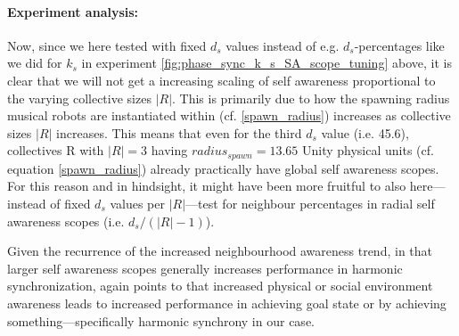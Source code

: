 				\paragraph{Experiment analysis:\nl}
				
				Now, since we here tested with fixed $d_s$ values instead of e.g. $d_s$-percentages like we did for $k_s$ in experiment \ref{fig:phase_sync_k_s_SA_scope_tuning} above, it is clear that we will not get a increasing scaling of self awareness proportional to the varying collective sizes $|R|$. This is primarily due to how the spawning radius musical robots are instantiated within (cf. \eqref{spawn_radius}) increases as collective sizes $|R|$ increases. This means that even for the third $d_s$ value (i.e. 45.6), collectives R with $|R|=3$ having $radius_{spawn}=13.65$ Unity physical units (cf. equation \eqref{spawn_radius}) already practically have global self awareness scopes. For this reason and in hindsight, it might have been more fruitful to also here—instead of fixed $d_s$ values per $|R|$—test for neighbour percentages in radial self awareness scopes (i.e. $d_s/(|R|-1)$).
				
				Given the recurrence of the increased neighbourhood awareness trend, in that larger self awareness scopes generally increases performance in harmonic synchronization, again points to that increased physical or social environment awareness leads to increased performance in achieving goal state or by achieving something—specifically harmonic synchrony in our case.
	
	
		
			
			
			
